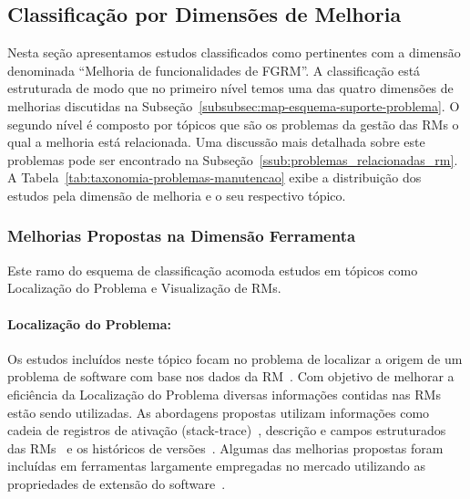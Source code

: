 \subsection{Classificação por Dimensões de Melhoria}
\label{sub:extensões_para_problemas_na_manutenção_de_software}

Nesta seção apresentamos estudos classificados como pertinentes com a dimensão
denominada ``Melhoria de funcionalidades de FGRM\@''. A classificação está
estruturada de modo que no primeiro nível temos uma das quatro dimensões de
melhorias discutidas na Subseção~\ref{subsubsec:map-esquema-suporte-problema}. O
segundo nível é composto por tópicos que são os problemas da gestão das RMs o
qual a melhoria está relacionada. Uma discussão mais detalhada sobre este
problemas pode ser encontrado na Subseção~\ref{ssub:problemas_relacionadas_rm}.
A Tabela~\ref{tab:taxonomia-problemas-manutencao} exibe a distribuição dos
estudos pela dimensão de melhoria e o seu respectivo tópico.




\subsubsection{Melhorias Propostas na Dimensão Ferramenta}
\label{ssub:melhorias_dim_ferramenta}

Este ramo do esquema de classificação acomoda estudos em tópicos como
Localização do Problema e Visualização de RMs.

\paragraph{Localização do Problema:} Os estudos incluídos neste tópico focam no
problema de localizar a origem de um problema de software com base nos dados da
RM~\cite{Hovemeyer:2004:FBE:1052883.1052895}. Com objetivo de melhorar a
eficiência da Localização do Problema diversas informações contidas nas RMs
estão sendo utilizadas. As abordagens propostas utilizam informações como cadeia
de registros de ativação (stack-trace)~\cite{Wong:2014:BBF:2705615.2706096},
des\-cri\-ção e campos estruturados das
RMs~\cite{Thung:2014:BIT:2635868.2661678} e os históricos de
versões~\cite{Bangcharoensap:2012:LSC:2419061.2419428, corley2011recovering,
	Romo:2015:TAT:2745802.2745833}.  Algumas das melhorias propostas foram
incluídas em ferramentas largamente empregadas no mercado utilizando as
propriedades de extensão do
software~\cite{Thung:2014:BIT:2635868.2661678,corley2011recovering}.

